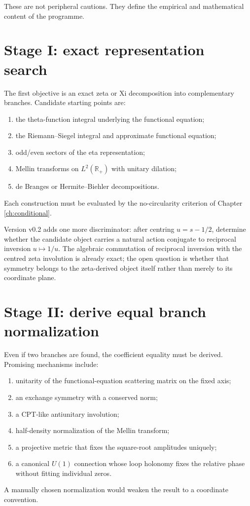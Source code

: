 These are not peripheral cautions. They define the empirical and mathematical content of the programme.

\section{Stage I: exact representation search}
The first objective is an exact zeta or Xi decomposition into complementary branches. Candidate starting points are:
\begin{enumerate}
\item the theta-function integral underlying the functional equation;
\item the Riemann--Siegel integral and approximate functional equation;
\item odd/even sectors of the eta representation;
\item Mellin transforms on $L^2(\mathbb R_+)$ with unitary dilation;
\item de Branges or Hermite--Biehler decompositions.
\end{enumerate}
Each construction must be evaluated by the no-circularity criterion of Chapter \ref{ch:conditional}.

Version v0.2 adds one more discriminator: after centring $u=s-1/2$, determine whether the candidate object carries a natural action conjugate to reciprocal inversion $u\mapsto1/u$. The algebraic commutation of reciprocal inversion with the centred zeta involution is already exact; the open question is whether that symmetry belongs to the zeta-derived object itself rather than merely to its coordinate plane.

\section{Stage II: derive equal branch normalization}
Even if two branches are found, the coefficient equality must be derived. Promising mechanisms include:
\begin{enumerate}
\item unitarity of the functional-equation scattering matrix on the fixed axis;
\item an exchange symmetry with a conserved norm;
\item a CPT-like antiunitary involution;
\item half-density normalization of the Mellin transform;
\item a projective metric that fixes the square-root amplitudes uniquely;
\item a canonical $U(1)$ connection whose loop holonomy fixes the relative phase without fitting individual zeros.
\end{enumerate}
A manually chosen normalization would weaken the result to a coordinate convention.

